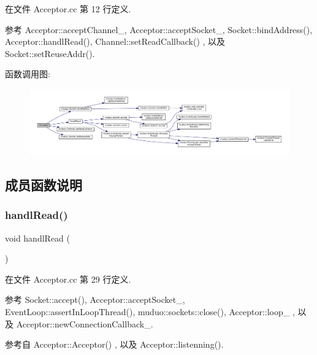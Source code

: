 在文件 Acceptor.\+cc 第 12 行定义.



参考 Acceptor\+::accept\+Channel\+\_\+, Acceptor\+::accept\+Socket\+\_\+, Socket\+::bind\+Address(), Acceptor\+::handl\+Read(), Channel\+::set\+Read\+Callback() , 以及 Socket\+::set\+Reuse\+Addr().

函数调用图\+:
\nopagebreak
\begin{figure}[H]
\begin{center}
\leavevmode
\includegraphics[width=350pt]{classmuduo_1_1Acceptor_a034c2e4c8c39c67bcaa4a47a6fa906fd_cgraph}
\end{center}
\end{figure}


\subsection{成员函数说明}
\mbox{\label{classmuduo_1_1Acceptor_a3459892d34c1eb51b40a53b8062237ca}} 
\subsubsection{\texorpdfstring{handl\+Read()}{handlRead()}}
{\footnotesize\ttfamily void handl\+Read (\begin{DoxyParamCaption}{ }\end{DoxyParamCaption})\hspace{0.3cm}{\ttfamily [private]}}



在文件 Acceptor.\+cc 第 29 行定义.



参考 Socket\+::accept(), Acceptor\+::accept\+Socket\+\_\+, Event\+Loop\+::assert\+In\+Loop\+Thread(), muduo\+::sockets\+::close(), Acceptor\+::loop\+\_\+ , 以及 Acceptor\+::new\+Connection\+Callback\+\_\+.



参考自 Acceptor\+::\+Acceptor() , 以及 Acceptor\+::listenning().

